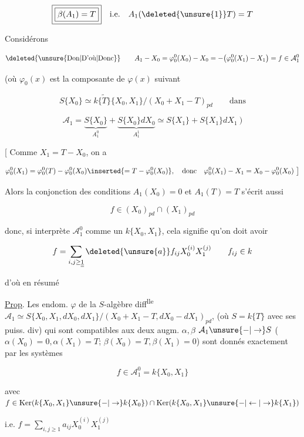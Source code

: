 
\[
\boxed{\boxed{\beta(A_1)=T}}\quad\text{i.e.}\quad A_1(\deleted{\unsure{1}}T)=T
\]

 Considérons

\[
\deleted{\text{\unsure{Don|D'où|Donc}}}\qquad A_1-X_0=\varphi_0^0(X_0)-X_0=-\bigl(\varphi_0^0(X_1)-X_1\bigr)=f\in\mathcal A_1^0
\]

(où $\varphi_0(x)$ est la composante de $\varphi(x)$ suivant

\[
S\{X_0\}\simeq k\widetilde{\{T\}}\{X_0,X_1\}/(X_0+X_1-T)_{pd}\qquad\text{dans}
\]

\[
\mathcal A_1=\underbrace{S\{X_0\}}_{A_1^0}+\underbrace{S\{X_0\}dX_0}_{A_1^1}\simeq S\{X_1\}+S\{X_1\}dX_1\ \bigr)
\]

[  Comme $X_1=T-X_0$, on a

\[
\varphi_0^0(X_1)=\varphi_0^0(T)-\varphi_0^0(X_0)\inserted{=T-\varphi_0^0(X_0)},\quad\text{donc}\quad \varphi_0^0(X_1)-X_1=X_0-\varphi_0^0(X_0)\ \bigr]
\]

Alors la conjonction des conditions $A_1(X_0)=0$ et $A_1(T)=T$ s'écrit aussi

\[
 f\in(X_0)_{pd}\cap(X_1)_{pd}
\]

donc, si  interprète $\mathcal A_1^0$ comme un  $k\{X_0,X_1\}$, cela signifie qu'on doit avoir

\[
 f=\sum_{i,j\geq\underline{\underline{1}}}\deleted{\unsure{a}}f_{ij}X_0^{(i)}X_1^{(j)}
 \qquad f_{ij}\in k
\]

d'où en résumé 

\uline{Prop}. Les endom. $\varphi$ de la $S$-algèbre diff\textsuperscript{lle} $\mathcal A_1\simeq S\{X_0,X_1,dX_0,dX_1\}/(X_0+X_1-T,dX_0-dX_1)_{pd}$, (où $S=k\{T\}$ avec ses puiss. div) qui sont compatibles aux deux augm. $\alpha,\beta$ $\mathcal A_1\unsure{-|\to} S$ ($\alpha(X_0)=0,\alpha(X_1)=T$; $\beta(X_0)=T,\beta(X_1)=0$) sont donnés exactement par les systèmes

\[
 f\in\mathcal A_1^0=k\{X_0,X_1\}
\]

avec $f\in\operatorname{Ker}(k\{X_0,X_1\}\unsure{-|\to}k\{X_0\})\cap\operatorname{Ker}(k\{X_0,X_1\}\unsure{-|\leftarrow|\to}k\{X_1\})$

i.e. $\boxed{f=\sum_{i,j\geq1}a_{ij}X_0^{(i)}X_1^{(j)}}$

